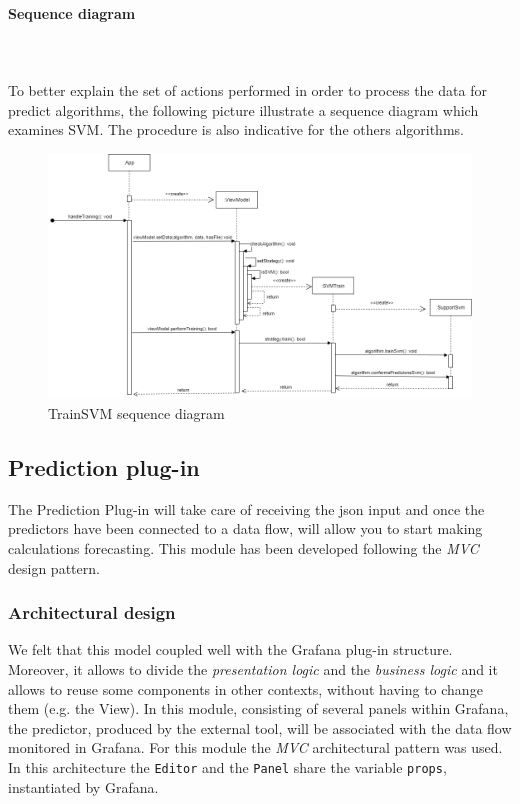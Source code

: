 \paragraph*{Sequence diagram}\mbox{} \\ \mbox{} \\
To better explain the set of actions performed in order to process the data for
predict algorithms, the following picture illustrate a sequence diagram which examines SVM. The procedure is also indicative for the others algorithms.

\begin{landscape}
\begin{center}
\begin{figure}[H]
\centering
\includegraphics[scale=0.65]{../../../Diagrams/Sequence_diagrams/trainSVM.png}
\caption{TrainSVM sequence diagram}
\end{figure}
\end{center}
\end{landscape}

\subsection{Prediction plug-in}
The Prediction Plug-in will take care of receiving the json input and once the predictors have been connected to a data flow, will allow you to start making calculations forecasting. This module has been developed following the \textit{MVC} design pattern.

\subsubsection{Architectural design}
We felt that this model coupled well with the Grafana plug-in structure.
Moreover, it allows to divide the \textit{presentation logic} and the \textit{business logic} and it allows to reuse some components in other contexts, without having to change them (e.g. the View).
In this module, consisting of several panels within Grafana, the predictor, produced by the external tool, will be associated with the data flow monitored in Grafana. For this module the \textit{MVC} architectural pattern was used. In this architecture the \texttt{Editor} and the \texttt{Panel} share the variable \texttt{props}, instantiated by Grafana.

